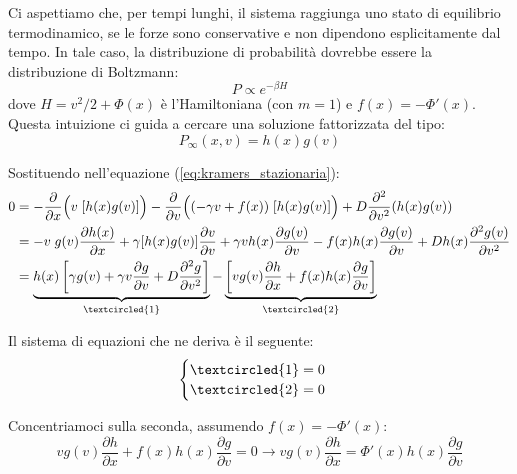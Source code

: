 \begin{tcolorbox}[
    colback=colorD!5,      
    colframe=colorD,       
    title={Attenzione},
    fonttitle=\bfseries\sffamily,
    arc=3mm,               
    boxrule=1.2pt,         
    halign title=flush left
]
Ci aspettiamo che, per tempi lunghi, il sistema raggiunga uno stato di equilibrio termodinamico, se le forze sono conservative e non dipendono esplicitamente dal tempo. In tale caso, la distribuzione di probabilità dovrebbe essere la distribuzione di Boltzmann:
\begin{equation*}
P \propto e^{-\beta H}
\end{equation*}
dove $H = v^2/2 + \Phi(x)$ è l'Hamiltoniana (con $m=1$) e $f(x) = -\Phi'(x)$.
Questa intuizione ci guida a cercare una soluzione fattorizzata del tipo:
\begin{equation*}
P_{\infty}(x,v) = h(x)g(v)
\end{equation*}
\end{tcolorbox}
Sostituendo nell'equazione (\ref{eq:kramers_stazionaria}):
\begin{align*}
0 &= -\frac{\partial}{\partial x}\Bigl(v \; [h(x)g(v)]\Bigr) - \frac{\partial}{\partial v} \Bigl((-\gamma v + f(x))\; [h(x)g(v)] \Bigr) + D \frac{\partial^2 }{\partial v^2} (h(x)g(v)) \\ 
&= - v \; g(v) \frac{\partial h(x)}{\partial x}  + \gamma [h(x)g(v)] \frac{\partial v}{\partial v}  + \gamma v h(x) \frac{\partial g(v)}{\partial v} - f(x) h(x) \frac{\partial g(v)}{\partial v} + D h(x)\frac{\partial^2g(v) }{\partial v^2} \\ 
&= \underbrace{h(x)\left[ \gamma g(v) + \gamma v \frac{\partial g}{\partial v} + D \frac{\partial^2 g}{\partial v^2} \right]}_{\textcircled{1}} - \underbrace{\left[ v g(v) \frac{\partial h}{\partial x} + f(x) h(x) \frac{\partial g}{\partial v} \right]}_{\textcircled{2}}
\end{align*}

Il sistema di equazioni che ne deriva è il seguente:
\begin{equation}
\begin{cases}
\textcircled{1} = 0 \\
\textcircled{2} = 0
\end{cases}
\end{equation}

Concentriamoci sulla seconda, assumendo $f(x) = -\Phi'(x)$:
\begin{equation}  
v g(v) \frac{\partial h}{\partial x} + f(x) h(x) \frac{\partial g}{\partial v} =0 \longrightarrow  v g(v) \frac{\partial h}{\partial x} = \Phi'(x) h(x) \frac{\partial g}{\partial v}
\end{equation}

